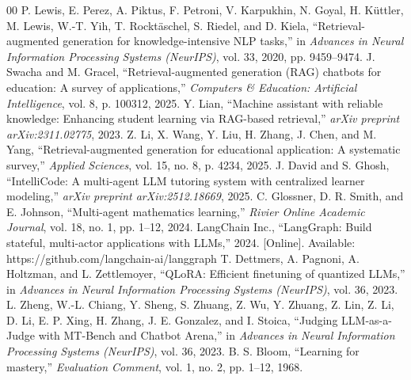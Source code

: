 \documentclass[conference]{IEEEtran}
\begin{document}
\begin{thebibliography}{00}
 P. Lewis, E. Perez, A. Piktus, F. Petroni, V. Karpukhin, N. Goyal, H. K\"{u}ttler, M. Lewis, W.-T. Yih, T. Rockt\"{a}schel, S. Riedel, and D. Kiela, ``Retrieval-augmented generation for knowledge-intensive NLP tasks,'' in \textit{Advances in Neural Information Processing Systems (NeurIPS)}, vol. 33, 2020, pp. 9459--9474.
 J. Swacha and M. Gracel, ``Retrieval-augmented generation (RAG) chatbots for education: A survey of applications,'' \textit{Computers \& Education: Artificial Intelligence}, vol. 8, p. 100312, 2025.
 Y. Lian, ``Machine assistant with reliable knowledge: Enhancing student learning via RAG-based retrieval,'' \textit{arXiv preprint arXiv:2311.02775}, 2023.
 Z. Li, X. Wang, Y. Liu, H. Zhang, J. Chen, and M. Yang, ``Retrieval-augmented generation for educational application: A systematic survey,'' \textit{Applied Sciences}, vol. 15, no. 8, p. 4234, 2025.
 J. David and S. Ghosh, ``IntelliCode: A multi-agent LLM tutoring system with centralized learner modeling,'' \textit{arXiv preprint arXiv:2512.18669}, 2025.
 C. Glossner, D. R. Smith, and E. Johnson, ``Multi-agent mathematics learning,'' \textit{Rivier Online Academic Journal}, vol. 18, no. 1, pp. 1--12, 2024.
 LangChain Inc., ``LangGraph: Build stateful, multi-actor applications with LLMs,'' 2024. [Online]. Available: https://github.com/langchain-ai/langgraph
 T. Dettmers, A. Pagnoni, A. Holtzman, and L. Zettlemoyer, ``QLoRA: Efficient finetuning of quantized LLMs,'' in \textit{Advances in Neural Information Processing Systems (NeurIPS)}, vol. 36, 2023.
 L. Zheng, W.-L. Chiang, Y. Sheng, S. Zhuang, Z. Wu, Y. Zhuang, Z. Lin, Z. Li, D. Li, E. P. Xing, H. Zhang, J. E. Gonzalez, and I. Stoica, ``Judging LLM-as-a-Judge with MT-Bench and Chatbot Arena,'' in \textit{Advances in Neural Information Processing Systems (NeurIPS)}, vol. 36, 2023.
 B. S. Bloom, ``Learning for mastery,'' \textit{Evaluation Comment}, vol. 1, no. 2, pp. 1--12, 1968.
\end{thebibliography}
\end{document}

